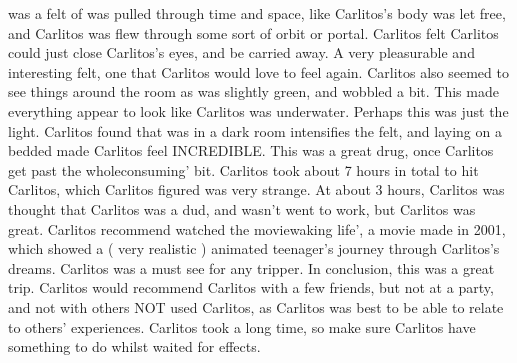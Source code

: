 \documentclass[12pt]{book}
\begin{document}
was a felt of was pulled through time and space, like Carlitos's body was let free, and Carlitos was flew through some sort of orbit or portal. Carlitos felt Carlitos could just close Carlitos's eyes, and be carried away. A very pleasurable and interesting felt, one that Carlitos would love to feel again. Carlitos also seemed to see things around the room as was slightly green, and wobbled a bit. This made everything appear to look like Carlitos was underwater. Perhaps this was just the light. Carlitos found that was in a dark room intensifies the felt, and laying on a bedded made Carlitos feel INCREDIBLE. This was a great drug, once Carlitos get past the wholeconsuming' bit. Carlitos took about 7 hours in total to hit Carlitos, which Carlitos figured was very strange. At about 3 hours, Carlitos was thought that Carlitos was a dud, and wasn't went to work, but Carlitos was great. Carlitos recommend watched the moviewaking life', a movie made in 2001, which showed a ( very realistic ) animated teenager's journey through Carlitos's dreams. Carlitos was a must see for any tripper. In conclusion, this was a great trip. Carlitos would recommend Carlitos with a few friends, but not at a party, and not with others NOT used Carlitos, as Carlitos was best to be able to relate to others' experiences. Carlitos took a long time, so make sure Carlitos have something to do whilst waited for effects.
\end{document}
